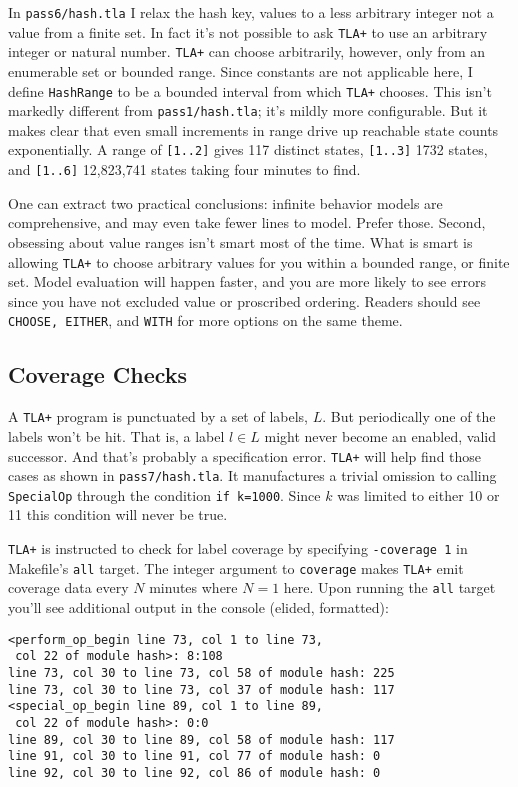 \documentclass[twocolumn]{article}
\begin{document}
In \texttt{pass6/hash.tla} I relax the hash key, values to a less arbitrary integer not a value from a finite set. In fact it's not possible to ask \texttt{TLA+} to use an arbitrary integer or natural number. \texttt{TLA+} can choose arbitrarily, however, only from an enumerable set or bounded range. Since constants are not applicable here, I define \texttt{HashRange} to be a bounded interval from which \texttt{TLA+} chooses. This isn't markedly different from \texttt{pass1/hash.tla}; it's mildly more configurable. But it makes clear that even small increments in range drive up reachable state counts exponentially. A range of \texttt{[1..2]} gives 117 distinct states, \texttt{[1..3]} 1732 states, and \texttt{[1..6]} 12,823,741 states taking four minutes to find.

One can extract two practical conclusions: infinite behavior models are comprehensive, and may even take fewer lines to model. Prefer those. Second, obsessing about value ranges isn't smart most of the time. What is smart is allowing \texttt{TLA+} to choose arbitrary values for you within a bounded range, or finite set. Model evaluation will happen faster, and you are more likely to see errors since you have not excluded value or proscribed ordering. Readers should see \texttt{CHOOSE, EITHER}, and \texttt{WITH} for more options on the same theme.

\subsection{Coverage Checks}
A \texttt{TLA+} program is punctuated by a set of labels, $L$. But periodically one of the labels won't be hit. That is, a label $l \in L$ might never become an enabled, valid successor. And that's probably a specification error. \texttt{TLA+} will help find those cases as shown in \texttt{pass7/hash.tla}. It manufactures a trivial omission to calling \texttt{SpecialOp} through the condition \texttt{if k=1000}. Since $k$ was limited to either 10 or 11 this condition will never be true. 

\texttt{TLA+} is instructed to check for label coverage by specifying \texttt{-coverage 1} in Makefile's \texttt{all} target. The integer argument to \texttt{coverage} makes \texttt{TLA+} emit coverage data every $N$ minutes where $N=1$ here. Upon running the \texttt{all} target you'll see additional output in the console (elided, formatted):

\begin{verbatim}
<perform_op_begin line 73, col 1 to line 73, 
 col 22 of module hash>: 8:108
line 73, col 30 to line 73, col 58 of module hash: 225
line 73, col 30 to line 73, col 37 of module hash: 117
<special_op_begin line 89, col 1 to line 89,
 col 22 of module hash>: 0:0
line 89, col 30 to line 89, col 58 of module hash: 117
line 91, col 30 to line 91, col 77 of module hash: 0
line 92, col 30 to line 92, col 86 of module hash: 0
\end{verbatim}
\end{document}
